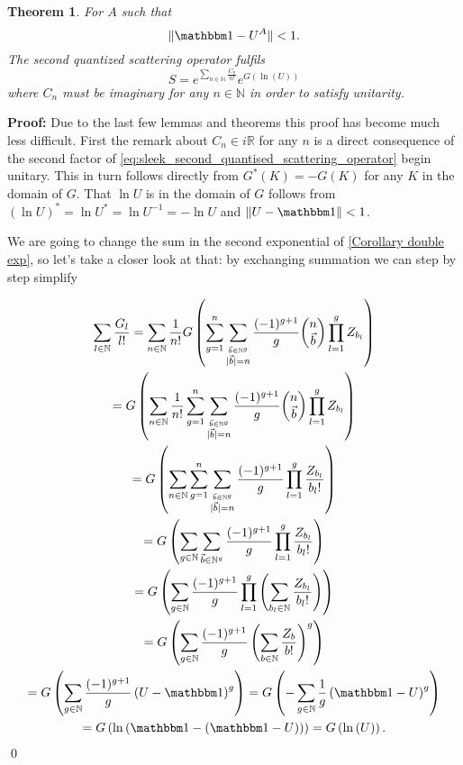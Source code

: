 \documentclass[b5paper,draft,openbib,12pt]{memoir}
\newtheorem{Thm}[Def]{Theorem}
\newcommand{\id}{{\mathbbm 1}}
\begin{document}
\begin{Thm}\label{sleek_second_quantised_scattering_operator}
For \(A\) such that 
\begin{equation}
\|\id-U^A\|<1.
\end{equation}
The second quantized scattering operator fulfils
\begin{equation}\label{eq:sleek_second_quantised_scattering_operator}
S= e^{\sum_{n\in\mathbb{N}} \frac{C_n}{n!}} e^{G(\ln (U))}
\end{equation}
where \(C_n\) must be imaginary for any \(n\in\mathbb{N}\) in order to satisfy unitarity.

\end{Thm}
\textbf{Proof:} Due to the last few lemmas and theorems this proof has become much less difficult.
First the remark about \(C_n \in i \mathbb{R}\) for any \(n\) is a direct consequence of 
the second factor of \eqref{eq:sleek_second_quantised_scattering_operator} begin unitary.
This in turn follows directly from \(G^* (K)=-G(K)\) for any \(K\) in the domain of \(G\).
That \(\ln U\) is in the domain of \(G\) follows from \( (\ln U)^*=\ln U^*=\ln U^{-1}=-\ln U\)
and \(\|U-\id\|<1\).

 We are going to change the sum in the second exponential of 
\eqref{Corollary double exp}, so let's take a closer look at that: by exchanging summation
we can step by step simplify

\begin{multline}
\sum_{l\in\mathbb{N}} \frac{G_{l}}{l!}= 
\sum_{n \in\mathbb{N}} \frac{1}{n!} 
G\left( \sum_{g=1}^n \sum_{\stackrel{\vec{b}\in\mathbb{N}^g}{|\vec{b}|=n}}\frac{(-1)^{g+1}}{g} 
\binom{n}{\vec{b}} \prod_{l=1}^g Z_{b_l}  \right)\\
=G\left( \sum_{n \in\mathbb{N}} \frac{1}{n!} 
 \sum_{g=1}^n \sum_{\stackrel{\vec{b}\in\mathbb{N}^g}{|\vec{b}|=n}}\frac{(-1)^{g+1}}{g} 
\binom{n}{\vec{b}} \prod_{l=1}^g Z_{b_l}  \right)\\
=G\left( \sum_{n \in\mathbb{N}}
 \sum_{g=1}^n \sum_{\stackrel{\vec{b}\in\mathbb{N}^g}{|\vec{b}|=n}}\frac{(-1)^{g+1}}{g} 
 \prod_{l=1}^g \frac{Z_{b_l}}{b_l!}  \right)\\
=G\left( 
 \sum_{g\in\mathbb{N}} \sum_{\vec{b}\in\mathbb{N}^g}\frac{(-1)^{g+1}}{g} 
\prod_{l=1}^g \frac{Z_{b_l}}{b_l!}  \right)\\
=G\left( 
 \sum_{g\in\mathbb{N}} \frac{(-1)^{g+1}}{g} 
\prod_{l=1}^g \left(\sum_{b_l\in\mathbb{N}} \frac{Z_{b_l}}{b_l!} \right) \right)\\
=G\left( 
 \sum_{g\in\mathbb{N}} \frac{(-1)^{g+1}}{g} 
 \left(\sum_{b\in\mathbb{N}} \frac{Z_{b}}{b!} \right)^g \right)\\
 =G\left( 
 \sum_{g\in\mathbb{N}} \frac{(-1)^{g+1}}{g} 
 \left(U-\id \right)^g \right)
 =G\left( -
 \sum_{g\in\mathbb{N}} \frac{1}{g} 
 \left(\id-U \right)^g \right)\\
  =G\left( 
 \ln \left(\id-\left(\id-U\right) \right) \right)
 =G\left( \ln \left(U\right)\right).
\end{multline}
\qed
\end{document}
